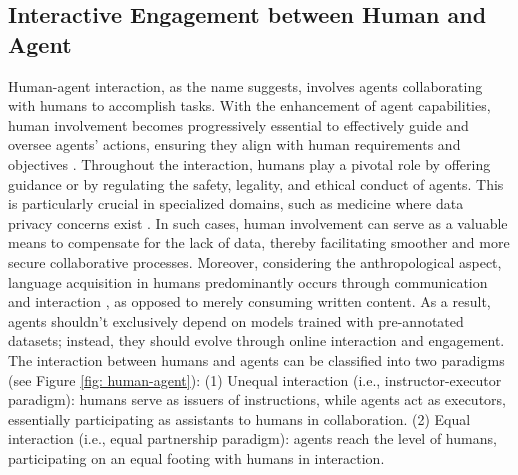 \subsection{Interactive Engagement between Human and Agent}\label{sec:Interactive Cooperation between Human-Agent}
Human-agent interaction, as the name suggests, involves agents collaborating with humans to accomplish tasks. 
With the enhancement of agent capabilities, human involvement becomes progressively essential to effectively guide and oversee agents' actions, ensuring they align with human requirements and objectives \cite{DBLP:journals/corr/abs-2103-14659, DBLP:journals/corr/abs-2209-00626}. 
Throughout the interaction, humans play a pivotal role by offering guidance or by regulating the safety, legality, and ethical conduct of agents. 
This is particularly crucial in specialized domains, such as medicine where data privacy concerns exist \cite{paul2023digitization}. In such cases, human involvement can serve as a valuable means to compensate for the lack of data, thereby facilitating smoother and more secure collaborative processes. 
Moreover, considering the anthropological aspect, language acquisition in humans predominantly occurs through communication and interaction \cite{bassiri2011interactional}, as opposed to merely consuming written content. 
As a result, agents shouldn't exclusively depend on models trained with pre-annotated datasets; instead, they should evolve through online interaction and engagement. 
The interaction between humans and agents can be classified into two paradigms (see Figure \ref{fig: human-agent}): (1) Unequal interaction (i.e., instructor-executor paradigm): humans serve as issuers of instructions, while agents act as executors, essentially participating as assistants to humans in collaboration. (2) Equal interaction (i.e., equal partnership paradigm): agents reach the level of humans, participating on an equal footing with humans in interaction.

